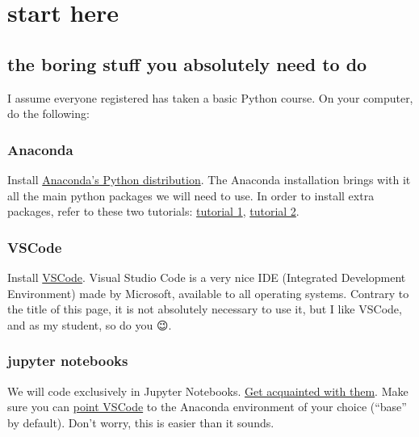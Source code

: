 \documentclass[
  letterpaper,
  DIV=11,
  numbers=noendperiod]{scrreprt}
\begin{document}
\part{start here}

\chapter{the boring stuff you absolutely need to
do}\label{the-boring-stuff-you-absolutely-need-to-do}

I assume everyone registered has taken a basic Python course. On your
computer, do the following:

\section{Anaconda}\label{anaconda}

Install \href{https://www.anaconda.com/download}{Anaconda's Python
distribution}. The Anaconda installation brings with it all the main
python packages we will need to use. In order to install extra packages,
refer to these two tutorials:
\href{https://www.tutorialspoint.com/how-do-i-install-python-packages-in-anaconda}{tutorial
1},
\href{https://docs.anaconda.com/free/anaconda/packages/install-packages.html}{tutorial
2}.

\section{VSCode}\label{vscode}

Install \href{https://code.visualstudio.com/download}{VSCode}. Visual
Studio Code is a very nice IDE (Integrated Development Environment) made
by Microsoft, available to all operating systems. Contrary to the title
of this page, it is not absolutely necessary to use it, but I like
VSCode, and as my student, so do you 😉.

\section{jupyter notebooks}\label{jupyter-notebooks}

We will code exclusively in Jupyter Notebooks.
\href{https://code.visualstudio.com/docs/datascience/jupyter-notebooks}{Get
acquainted with them}. Make sure you can
\href{https://opensourceoptions.com/blog/setup-anaconda-python-to-work-with-visual-studio-code-on-windows/}{point
VSCode} to the Anaconda environment of your choice (``base'' by
default). Don't worry, this is easier than it sounds.
\end{document}
